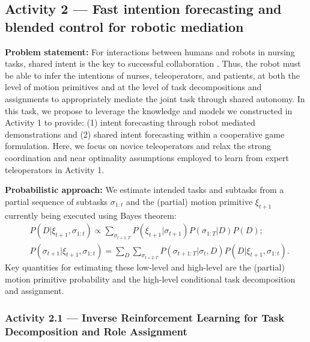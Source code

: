 \documentclass[letterpaper, 11 pt, onecolumn]{article}
\begin{document}


\subsection{Activity 2 --- Fast intention forecasting and blended control for robotic mediation}\label{sec:plan-intent}
{\bf Problem statement:} For interactions between humans and robots in nursing tasks, shared intent is the key to successful collaboration \cite{cite}.
Thus, the robot must be able to infer the intentions of nurses, teleoperators, and patients, at both the level of motion primitives and at the level of task decompositions and assignments to appropriately mediate the joint task through shared autonomy. In this task, we propose to leverage the knowledge and models we constructed in Activity 1 to provide: (1) intent forecasting through robot mediated demonstrations and (2) shared intent forecasting within a cooperative game formulation. 
Here, we focus on novice teleoperators and relax the strong coordination and near optimality assumptions employed to learn from expert teleoperators in Activity 1.

{\bf Probabilistic approach: }
We estimate intended tasks and subtasks from a partial sequence of subtasks $\sigma_{1:t}$ and the (partial) motion primitive $\xi_{t+1}$ currently being executed using Bayes theorem:
\begin{align}
& P(D|\xi_{t+1}, \sigma_{1:t}) \propto \sum_{\sigma_{t+1:T}} P(\xi_{t+1}|\sigma_{t+1}) P(\sigma_{1:T}|D) P(D);\\
& P(\sigma_{t+1}|\xi_{t+1}, \sigma_{1:t}) =
\sum_{D}\sum_{\sigma_{t+2:T}} P(\sigma_{t+1:T}|\sigma_t,D) P(D|\xi_{t+1}, \sigma_{1:t}).
\end{align}
Key quantities for estimating these low-level and high-level are the (partial) motion primitive probability and the high-level conditional task decomposition and assignment.

\subsubsection{Activity 2.1 --- Inverse Reinforcement Learning for Task Decomposition and Role Assignment}\label{sec:plan-intent-Stackelberg}
\end{document}
